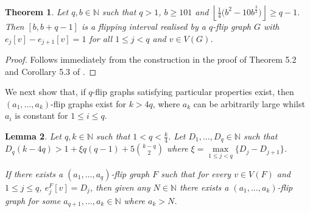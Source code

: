 \documentclass[a4paper,12pt]{article}
\newtheorem{theorem}{Theorem}[section]
\newtheorem{lemma}[theorem]{Lemma}
\begin{document}
\begin{theorem}\label{flippingIntervalCorr}
Let $q, b \in \mathbb{N}$ such that $q > 1$, $b \geq 101$ and $\left\lfloor \frac{1}{4} \big(b^2 - 10b^{\frac{3}{2}}\big)\right\rfloor \geq q - 1$. Then $[b, b+q-1]$ is a flipping interval realised by a $q$-flip graph $G$ with $e_j [v] - e_{j+1} [v] = 1$ for all $1 \leq j < q$ and $v \in V(G)$. 
\end{theorem}

\begin{proof}
	Follows immediately from the construction in the proof of Theorem 5.2 and Corollary 5.3 of \cite{caro2023flip}.
\end{proof}

We next show that, if $q$-flip graphs satisfying particular properties exist, then $(a_1, \dots, a_k)$-flip graphs exist for $k > 4q$, where $a_k$ can be arbitrarily large whilst $a_i$ is constant for $1 \leq i \leq q$. 

\begin{lemma} \label{GapsProp}
	Let $q, k \in \mathbb{N}$ such that $1 < q < \frac{k}{4}$. Let $D_1, \dots, D_q \in \mathbb{N}$ such that $D_q (k - 4q) > 1 + \xi q(q-1) + 5\binom{k-q}{2}$ where $\xi = \max\limits_{1 \leq j < q}\{D_j - D_{j+1}\}$. 
	
	If there exists a $(a_1, \dots, a_q)$-flip graph $F$ such that for every $v \in V(F)$ and $1 \leq j \leq q$, $e_j^F [v] = D_j$, then given any $N \in \mathbb{N}$ there exists a $(a_1, \dots, a_k)$-flip graph for some $a_{q+1}, \dots, a_k \in \mathbb{N}$ where $a_k > N$.
\end{lemma}
\end{document}

